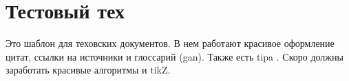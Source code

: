 \section{Тестовый тех}
\begin{grayquote}
	Это шаблон для теховских документов. В нем работают красивое оформление цитат, ссылки на источники \autocite{GAN} и глоссарий (\gls{gan}). Также есть tipa . Скоро должны заработать красивые алгоритмы и tikZ.
\end{grayquote}
